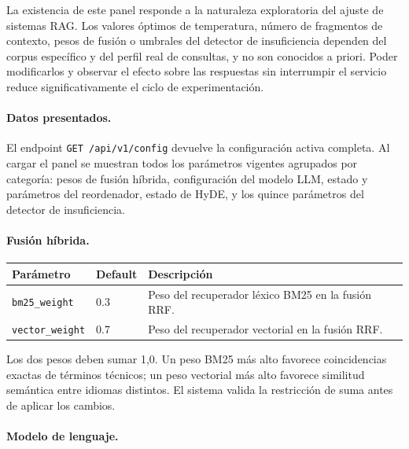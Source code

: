 \documentclass[11pt]{article}
\begin{document}
La existencia de este panel responde a la naturaleza exploratoria del ajuste de sistemas RAG.
Los valores óptimos de temperatura, número de fragmentos de contexto, pesos de fusión o
umbrales del detector de insuficiencia dependen del corpus específico y del perfil real de
consultas, y no son conocidos a priori. Poder modificarlos y observar el efecto sobre las
respuestas sin interrumpir el servicio reduce significativamente el ciclo de experimentación.

\paragraph{Datos presentados.}
El endpoint \texttt{GET /api/v1/config} devuelve la configuración activa completa. Al cargar
el panel se muestran todos los parámetros vigentes agrupados por categoría: pesos de fusión
híbrida, configuración del modelo LLM, estado y parámetros del reordenador, estado de HyDE,
y los quince parámetros del detector de insuficiencia.

\paragraph{Fusión híbrida.}

\begin{center}
\begin{tabular}{lll}
\toprule
\textbf{Parámetro} & \textbf{Default} & \textbf{Descripción} \\
\midrule
\texttt{bm25\_weight}   & 0.3 & Peso del recuperador léxico BM25 en la fusión RRF. \\
\texttt{vector\_weight} & 0.7 & Peso del recuperador vectorial en la fusión RRF. \\
\bottomrule
\end{tabular}
\end{center}

Los dos pesos deben sumar 1{,}0. Un peso BM25 más alto favorece coincidencias exactas de
términos técnicos; un peso vectorial más alto favorece similitud semántica entre idiomas
distintos. El sistema valida la restricción de suma antes de aplicar los cambios.

\paragraph{Modelo de lenguaje.}
\end{document}
